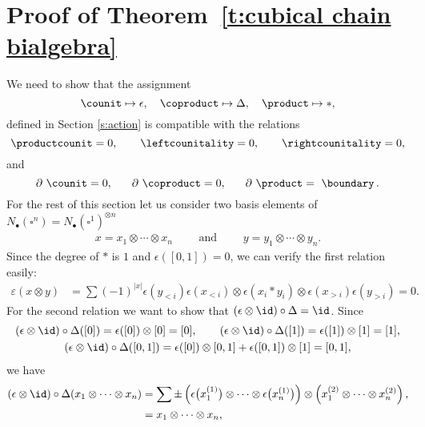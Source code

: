 
\section{Proof of Theorem~\ref{t:cubical chain bialgebra}} \label{s:proof}

We need to show that the assignment
\begin{equation*}
\counit \mapsto \epsilon, \quad \coproduct \mapsto \Delta, \quad \product \mapsto \ast,
\end{equation*}
defined in Section \ref{s:action} is compatible with the relations
\begin{equation*}
\productcounit = 0,
\qquad
\leftcounitality = 0,
\qquad
\rightcounitality = 0,
\end{equation*}
and
\begin{equation*}
\partial\ \counit = 0,
\hspace*{.6cm}
\partial\ \coproduct = 0,
\hspace*{.6cm}
\partial\ \product = \ \boundary\,.
\end{equation*}
For the rest of this section let us consider two basis elements of $N_\bullet(\square^n) = N_\bullet(\square^1)^{\otimes n}$
\begin{align*}
x = x_1 \otimes \cdots \otimes x_n
\qquad \text{ and } \qquad
y = y_1 \otimes \cdots \otimes y_n.
\end{align*}
Since the degree of $\ast$ is $1$ and $\epsilon([0,1]) = 0$, we can verify the first relation easily:
\begin{align*}
\varepsilon(x \otimes y) & =
\sum (-1)^{|x|} \epsilon(y_{<i}) \epsilon(x_{<i}) \otimes \epsilon(x_i \ast y_i) \otimes \epsilon(x_{>i}) \epsilon(y_{>i}) = 0.
\end{align*}
For the second relation we want to show that $(\epsilon \otimes \id) \circ \Delta = \id$.
Since
\begin{gather*}
(\epsilon \otimes \id) \circ \Delta([0]) = \epsilon([0]) \otimes [0] = [0], \qquad
(\epsilon \otimes \id) \circ \Delta([1]) = \epsilon([1]) \otimes [1] = [1], \\
(\epsilon \otimes \id) \circ \Delta([0, 1]) = \epsilon([0]) \otimes [0, 1] + \epsilon([0, 1]) \otimes [1] = [0,1],
\end{gather*}
we have
\begin{align*}	
(\epsilon \otimes \id) \circ \Delta (x_1 \otimes \cdots \otimes x_n) &=
\sum \pm \left( \epsilon \big(x_1^{(1)}\big) \otimes \cdots \otimes \epsilon\big(x_n^{(1)}\big) \right) \otimes 	
\left( x_1^{(2)} \otimes \cdots \otimes x_n^{(2)} \right), \\ &=
x_1 \otimes \cdots \otimes x_n,
\end{align*}	
